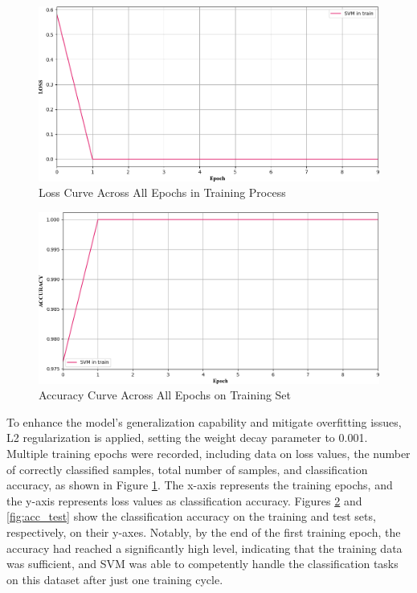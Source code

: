 \documentclass[twocolumn]{article}
\begin{document}
\begin{figure}[h]
	\centering
	\includegraphics[width=1.0\linewidth]{exp_log/train440_valid024/LOSS_train}
	\caption{Loss Curve Across All Epochs in Training Process}
	\label{fig:loss_train}
\end{figure}

\begin{figure}[h]
	\centering
	\includegraphics[width=1.0\linewidth]{exp_log/train440_valid024/ACCURACY_train}
	\caption{Accuracy Curve Across All Epochs on Training Set}
	\label{fig:acc_train}
\end{figure}

To enhance the model's generalization capability and mitigate overfitting issues, L2 regularization is applied, setting the weight decay parameter to 0.001. Multiple training epochs were recorded, including data on loss values, the number of correctly classified samples, total number of samples, and classification accuracy, as shown in Figure \ref{fig:loss_train}. The x-axis represents the training epochs, and the y-axis represents loss values as classification accuracy.
Figures \ref{fig:acc_train} and \ref{fig:acc_test} show the classification accuracy on the training and test sets, respectively, on their y-axes.
Notably, by the end of the first training epoch, the accuracy had reached a significantly high level, indicating that the training data was sufficient, and SVM was able to competently handle the classification tasks on this dataset after just one training cycle.
\end{document}
